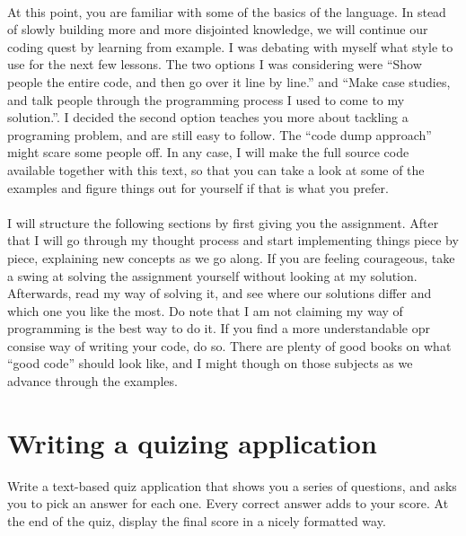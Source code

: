 \documentclass[11pt,fleqn]{book} %
\begin{document}
\paragraph{}At this point, you are familiar with some of the basics of the language. In stead of slowly building more and more disjointed knowledge, we will continue our coding quest by learning from example. I was debating with myself what style to use for the next few lessons. The two options I was considering were ``Show people the entire code, and then go over it line by line.'' and ``Make case studies, and talk people through the programming process I used to come to my solution.''. I decided the second option teaches you more about tackling a programing problem, and are still easy to follow. The ``code dump approach'' might scare some people off. In any case, I will make the full source code available together with this text, so that you can take a look at some of the examples and figure things out for yourself if that is what you prefer.

\paragraph{}I will structure the following sections by first giving you the assignment. After that I will go through my thought process and start implementing things piece by piece, explaining new concepts as we go along. If you are feeling courageous, take a swing at solving the assignment yourself without looking at my solution. Afterwards, read my way of solving it, and see where our solutions differ and which one you like the most. Do note that I am not claiming my way of programming is the best way to do it. If you find a more understandable opr consise way of writing your code, do so. There are plenty of good books on what ``good code'' should look like, and I might though on those subjects as we advance through the examples.

\section{Writing a quizing application}

\begin{exercise}
Write a text-based quiz application that shows you a series of questions, and asks you to pick an answer for each one.
Every correct answer adds to your score. At the end of the quiz, display the final score in a nicely formatted way. 
\end{exercise}
\end{document}

